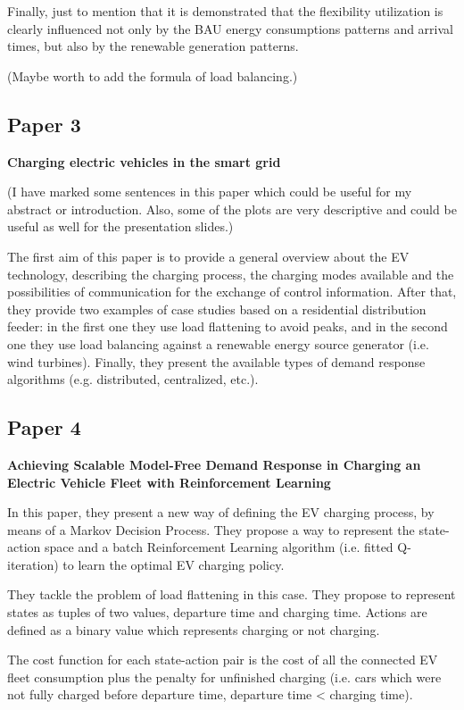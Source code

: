 Finally, just to mention that it is demonstrated that the flexibility utilization is clearly influenced not only by the BAU energy consumptions patterns and arrival times, but also by the renewable generation patterns.

(Maybe worth to add the formula of load balancing.)

\subsection{Paper 3}
\textbf{Charging electric vehicles in the smart grid}

(I have marked some sentences in this paper which could be useful for my abstract or introduction. Also, some of the plots are very descriptive and could be useful as well for the presentation slides.)

The first aim of this paper is to provide a general overview about the EV technology, describing the charging process, the charging modes available and the possibilities of communication for the exchange of control information. After that, they provide two examples of case studies based on a residential distribution feeder: in the first one they use load flattening to avoid peaks, and in the second one they use load balancing against a renewable energy source generator (i.e. wind turbines). Finally, they present the available types of demand response algorithms (e.g. distributed, centralized, etc.).

\subsection{Paper 4}
\textbf{Achieving Scalable Model-Free Demand Response in Charging an Electric Vehicle Fleet with Reinforcement Learning}

In this paper, they present a new way of defining the EV charging process, by means of a Markov Decision Process. They propose a way to represent the state-action space and a batch Reinforcement Learning algorithm (i.e. fitted Q-iteration) to learn the optimal EV charging policy.

They tackle the problem of load flattening in this case. They propose to represent states as tuples of two values, departure time and charging time. Actions are defined as a binary value which represents charging or not charging.

The cost function for each state-action pair is the cost of all the connected EV fleet consumption plus the penalty for unfinished charging (i.e. cars which were not fully charged before departure time, departure time < charging time).

